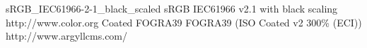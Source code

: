 
%
%
%
%
%

\usepackage{silence}

\usepackage[a-1b]{pdfx}
                   {sRGB_IEC61966-2-1_black_scaled}
                   {sRGB IEC61966 v2.1 with black scaling}
                   {http://www.color.org}
                    {Coated FOGRA39}
                    {FOGRA39 (ISO Coated v2 300\% (ECI))}
                    {http://www.argyllcms.com/}

\usepackage{adforn}
\usepackage{pythontex}
\usepackage{multicol}
\usepackage{cmap} %




